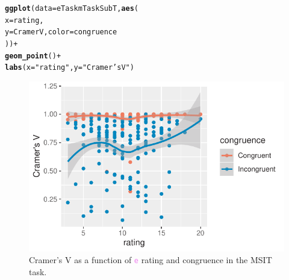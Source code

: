 \documentclass{article}\usepackage[]{graphicx}\usepackage[]{color}
\makeatletter
\newcommand{\hlstr}[1]{\textcolor[rgb]{0.192,0.494,0.8}{#1}}%
\newcommand{\hlopt}[1]{\textcolor[rgb]{0,0,0}{#1}}%
\newcommand{\hlstd}[1]{\textcolor[rgb]{0.345,0.345,0.345}{#1}}%
\newcommand{\hlkwc}[1]{\textcolor[rgb]{0.333,0.667,0.333}{#1}}%
\newcommand{\hlkwd}[1]{\textcolor[rgb]{0.737,0.353,0.396}{\textbf{#1}}}%
\newenvironment{kframe}{%
 \def\at@end@of@kframe{}%
 \ifinner\ifhmode%
  \def\at@end@of@kframe{\end{minipage}}%
  \begin{minipage}{\columnwidth}%
 \fi\fi%
 \def\FrameCommand##1{\hskip\@totalleftmargin \hskip-\fboxsep
 \colorbox{shadecolor}{##1}\hskip-\fboxsep
     \hskip-\linewidth \hskip-\@totalleftmargin \hskip\columnwidth}%
 \MakeFramed {\advance\hsize-\width
   \@totalleftmargin\z@ \linewidth\hsize
   \@setminipage}}%
 {\par\unskip\endMakeFramed%
 \at@end@of@kframe}
\newenvironment{knitrout}{}{} %
\newcommand{\code}[1]{\textup{\texttt{\textcolor{violet}{#1}}}}
\makeatother
\begin{document}
\begin{knitrout}\footnotesize
{}\color{fgcolor}\begin{kframe}
\begin{alltt}
\hlkwd{ggplot}\hlstd{(}\hlkwc{data} \hlstd{= eTaskmTaskSubT,} \hlkwd{aes}\hlstd{(}
  \hlkwc{x} \hlstd{= rating,}
  \hlkwc{y} \hlstd{= CramerV,} \hlkwc{color} \hlstd{= congruence}
\hlstd{))} \hlopt{+}
  \hlkwd{geom_point}\hlstd{()} \hlopt{+}
  \hlkwd{labs}\hlstd{(}\hlkwc{x} \hlstd{=} \hlstr{"rating"}\hlstd{,} \hlkwc{y} \hlstd{=} \hlstr{"Cramer's V"}\hlstd{)}
\end{alltt}
\end{kframe}
\end{knitrout}

\begin{figure}
\begin{knitrout}\footnotesize
{}\color{fgcolor}

{\centering \includegraphics[width=0.75\linewidth]{figure/graphics-gg_eTaskRatingmTaskCong-show-1} 

}



\end{knitrout}
\caption{Cramer's V as a function of \code{e} rating and congruence in the MSIT task.}\label{fig:eTaskmTaskSub}
\end{figure}
\end{document}
